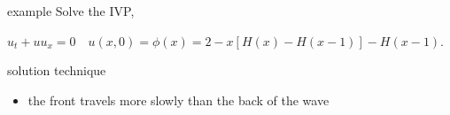 \documentclass[t,10pt,fleqn]{beamer}
\begin{document}
\begin{frame}
\pause
\begin{block}{example}
Solve the IVP,
\begin{center}
$u_t + u u_x =0 \quad u(x,0)=\phi(x) = 2 - x [ H(x) -H(x-1) ] - H(x-1)$.
\end{center}
\end{block} 
\pause
\begin{block}{solution technique}

       \begin{itemize}
       \pause
       \item the front travels more slowly than the back of the wave
              \pause
               
        \end{itemize}
       
\end{block}


\end{frame}
\end{document}
